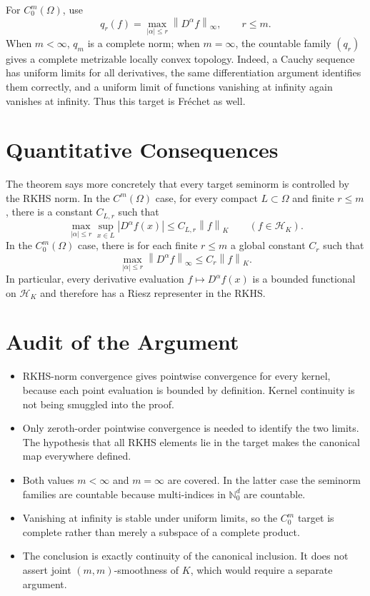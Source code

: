 \documentclass[11pt]{article}
\newcommand{\Hk}{\mathcal H_K}
\newcommand{\norm}[1]{\left\lVert #1\right\rVert}
\begin{document}
For $C^m_0(\Omega)$, use
\[
 q_r(f)=\max_{|\alpha|\leq r}\norm{D^\alpha f}_\infty,
 \qquad r\leq m.
\]
When $m<\infty$, $q_m$ is a complete norm; when $m=\infty$, the
countable family \((q_r)\) gives a complete metrizable locally convex
topology.  Indeed, a Cauchy sequence has uniform limits for all derivatives,
the same differentiation argument identifies them correctly, and a uniform
limit of functions vanishing at infinity again vanishes at infinity.  Thus
this target is Fr\'echet as well.

\section*{Quantitative Consequences}

The theorem says more concretely that every target seminorm is controlled by
the RKHS norm.  In the $C^m(\Omega)$ case, for every compact
$L\subset\Omega$ and finite $r\leq m$, there is a constant $C_{L,r}$
such that
\[
 \max_{|\alpha|\leq r}\sup_{x\in L}|D^\alpha f(x)|
 \leq C_{L,r}\norm f_K
 \qquad(f\in\Hk).
\]
In the $C^m_0(\Omega)$ case, there is for each finite $r\leq m$ a global
constant $C_r$ such that
\[
 \max_{|\alpha|\leq r}\norm{D^\alpha f}_\infty
 \leq C_r\norm f_K.
\]
In particular, every derivative evaluation $f\mapsto D^\alpha f(x)$ is a
bounded functional on \(\Hk\) and therefore has a Riesz representer in the
RKHS.

\section*{Audit of the Argument}

\begin{itemize}
\item RKHS-norm convergence gives pointwise convergence for every kernel,
because each point evaluation is bounded by definition.  Kernel continuity
is not being smuggled into the proof.
\item Only zeroth-order pointwise convergence is needed to identify the two
limits.  The hypothesis that all RKHS elements lie in the target makes the
canonical map everywhere defined.
\item Both values $m<\infty$ and $m=\infty$ are covered.  In the latter
case the seminorm families are countable because multi-indices in
\(\mathbb N_0^d\) are countable.
\item Vanishing at infinity is stable under uniform limits, so the
\(C^m_0\) target is complete rather than merely a subspace of a complete
product.
\item The conclusion is exactly continuity of the canonical inclusion.  It
does not assert joint \((m,m)\)-smoothness of $K$, which would require a
separate argument.
\end{itemize}
\end{document}
